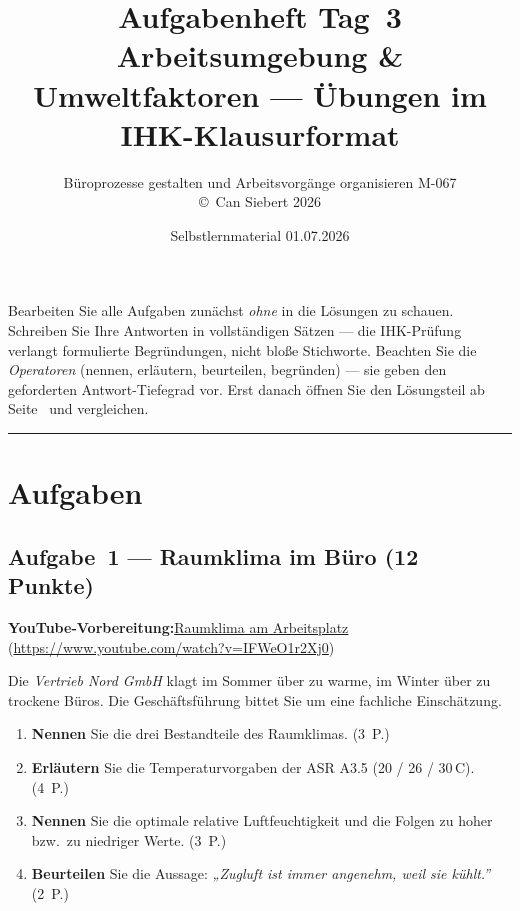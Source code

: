 \documentclass[11pt, a4paper]{article}
\title{\vspace*{-1.5cm}\Huge\bfseries\color{bfwPrimaryDark}Aufgabenheft Tag~3\\[0.4em]
  \large\color{bfwInkSoft}\textnormal{Arbeitsumgebung \& Umweltfaktoren --- Übungen im IHK-Klausurformat}}
\author{\textsf{Büroprozesse gestalten und Arbeitsvorgänge organisieren \textperiodcentered{} M-067}\\
\textsf{\small\copyright\ Can Siebert\,\textperiodcentered\,2026}}
\date{Selbstlernmaterial \textperiodcentered{} 01.07.2026}
\begin{document}
\maketitle
\thispagestyle{empty}

\begin{merksatz}[title={\bfseries So nutzen Sie dieses Aufgabenheft}]
Bearbeiten Sie alle Aufgaben zunächst \emph{ohne} in die Lösungen zu schauen. Schreiben
Sie Ihre Antworten in vollständigen Sätzen --- die IHK-Prüfung verlangt formulierte
Begründungen, nicht bloße Stichworte. Beachten Sie die \emph{Operatoren} (nennen,
erläutern, beurteilen, begründen) --- sie geben den geforderten Antwort-Tiefegrad vor.
Erst danach öffnen Sie den Lösungsteil ab Seite~\pageref{loesungen} und vergleichen.
\end{merksatz}

\tableofcontents
\vspace{1em}
\hrule

\section{Aufgaben}

\subsection*{Aufgabe~1 --- Raumklima im Büro (12 Punkte)}

\noindent\textbf{\color{bfwAccent}YouTube-Vorbereitung:}\enspace \href{https://www.youtube.com/watch?v=IFWeO1r2Xj0}{Raumklima am Arbeitsplatz} (\url{https://www.youtube.com/watch?v=IFWeO1r2Xj0})

\medskip
Die \emph{Vertrieb Nord GmbH} klagt im Sommer über zu warme, im Winter über zu trockene
Büros. Die Geschäftsführung bittet Sie um eine fachliche Einschätzung.

\begin{enumerate}[label=(\alph*)]
  \item \textbf{Nennen} Sie die drei Bestandteile des Raumklimas. \hfill (3~P.)
  \item \textbf{Erläutern} Sie die Temperaturvorgaben der ASR A3.5 (20 / 26 / 30\,\textdegree C). \hfill (4~P.)
  \item \textbf{Nennen} Sie die optimale relative Luftfeuchtigkeit und die Folgen zu hoher bzw.\ zu niedriger Werte. \hfill (3~P.)
  \item \textbf{Beurteilen} Sie die Aussage: \emph{„Zugluft ist immer angenehm, weil sie kühlt.”} \hfill (2~P.)
\end{enumerate}
\end{document}
